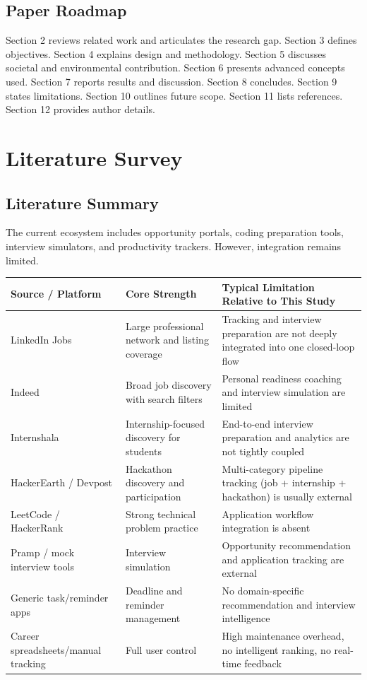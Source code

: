 \documentclass[conference]{IEEEtran}
\begin{document}
\subsection{Paper Roadmap}

Section 2 reviews related work and articulates the research gap. Section 3 defines objectives. Section 4 explains design and methodology. Section 5 discusses societal and environmental contribution. Section 6 presents advanced concepts used. Section 7 reports results and discussion. Section 8 concludes. Section 9 states limitations. Section 10 outlines future scope. Section 11 lists references. Section 12 provides author details.

\section{Literature Survey}

\subsection{Literature Summary}

The current ecosystem includes opportunity portals, coding preparation tools, interview simulators, and productivity trackers. However, integration remains limited.

\begin{table}[!tb]
\centering
\setlength{\tabcolsep}{4pt}
\normalsize
\begin{tabularx}{\textwidth}{|>{\RaggedRight\arraybackslash}X|>{\RaggedRight\arraybackslash}X|>{\RaggedRight\arraybackslash}X|}
\hline
 \textbf{Source / Platform} & \textbf{Core Strength} & \textbf{Typical Limitation Relative to This Study} \\
\hline
 LinkedIn Jobs & Large professional network and listing coverage & Tracking and interview preparation are not deeply integrated into one closed-loop flow \\
\hline
 Indeed & Broad job discovery with search filters & Personal readiness coaching and interview simulation are limited \\
\hline
 Internshala & Internship-focused discovery for students & End-to-end interview preparation and analytics are not tightly coupled \\
\hline
 HackerEarth / Devpost & Hackathon discovery and participation & Multi-category pipeline tracking (job + internship + hackathon) is usually external \\
\hline
 LeetCode / HackerRank & Strong technical problem practice & Application workflow integration is absent \\
\hline
 Pramp / mock interview tools & Interview simulation & Opportunity recommendation and application tracking are external \\
\hline
 Generic task/reminder apps & Deadline and reminder management & No domain-specific recommendation and interview intelligence \\
\hline
 Career spreadsheets/manual tracking & Full user control & High maintenance overhead, no intelligent ranking, no real-time feedback \\
\hline
\end{tabularx}
\end{table}
\end{document}
